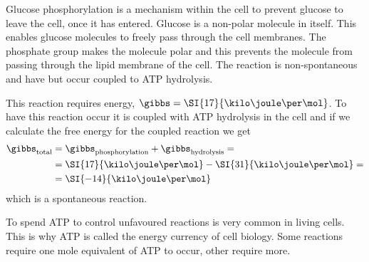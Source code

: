\documentclass[../mit-general-chemistry.tex]{subfiles}
\begin{document}
\begin{hfigure}
  \vspace{1em}
  \begin{center}
  \end{center}
  \caption{
    Glucose phosphorylation is a mechanism within the cell to
    prevent glucose to leave the cell, once it has entered.  Glucose
    is a non-polar molecule in itself. This enables glucose
    molecules to freely pass through the cell membranes. The
    phosphate group makes the molecule polar and this prevents the
    molecule from passing through the lipid membrane of the
    cell. The reaction is non-spontaneous and have but occur coupled
    to ATP hydrolysis.
  }
\end{hfigure}




This reaction requires energy, $\gibbs =
\SI{17}{\kilo\joule\per\mol}$. To have this reaction occur it is
coupled with ATP hydrolysis in the cell and if we calculate the free
energy for the coupled reaction we get
\begin{align*}
  \gibbs_{\text{total}} &=
  \gibbs_{\text{phosphorylation}} + \gibbs_{\text{hydrolysis}} =\\ 
  &= \SI{17}{\kilo\joule\per\mol} - \SI{31}{\kilo\joule\per\mol} =\\
  &= \SI{-14}{\kilo\joule\per\mol} \\
\end{align*}
which is a spontaneous reaction.

To spend ATP to control unfavoured reactions is very common in living
cells. This is why ATP is called the energy currency of cell
biology. Some reactions require one mole equivalent of ATP to occur,
other require more.
\end{document}
